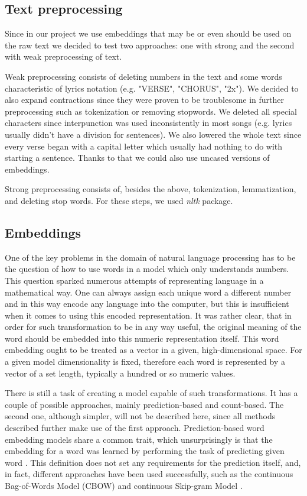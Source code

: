 \subsection{Text preprocessing}

Since in our project we use embeddings that may be or even should be used on the raw text we decided to test two approaches: one with strong and the second with weak preprocessing of text.

Weak preprocessing consists of deleting numbers in the text and some words characteristic of lyrics notation (e.g. "VERSE", "CHORUS", "2x"). We decided to also expand contractions since they were proven to be troublesome in further preprocessing such as tokenization or removing stopwords. We deleted all special characters since interpunction was used inconsistently in most songs (e.g. lyrics usually didn't have a division for sentences). We also lowered the whole text since every verse began with a capital letter which usually had nothing to do with starting a sentence. Thanks to that we could also use uncased versions of embeddings.

Strong preprocessing consists of, besides the above, tokenization, lemmatization, and deleting stop words. For these steps, we used \textit{nltk} package.

\subsection{Embeddings}

One of the key problems in the domain of natural language processing has to be the question of how to use words in a model which only understands numbers. This question sparked numerous attempts of representing language in a mathematical way. One can always assign each unique word a different number and in this way encode any language into the computer, but this is insufficient when it comes to using this encoded representation. It was rather clear, that in order for such transformation to be in any way useful, the original meaning of the word should be embedded into this numeric representation itself. This word embedding ought to be treated as a vector in a given, high-dimensional space. For a given model dimensionality is fixed, therefore each word is represented by a vector of a set length, typically a hundred or so numeric values.

There is still a task of creating a model capable of such transformations. It has a couple of possible approaches, mainly prediction-based and count-based. The second one, although simpler, will not be described here, since all methods described further make use of the first approach. Prediction-based word embedding models share a common trait, which unsurprisingly is that the embedding for a word was learned by performing the task of predicting given word \cite{baroni}. This definition does not set any requirements for the prediction itself, and, in fact, different approaches have been used successfully, such as the continuous Bag-of-Words Model (CBOW) and  continuous Skip-gram Model \cite{mikolov2013}.

